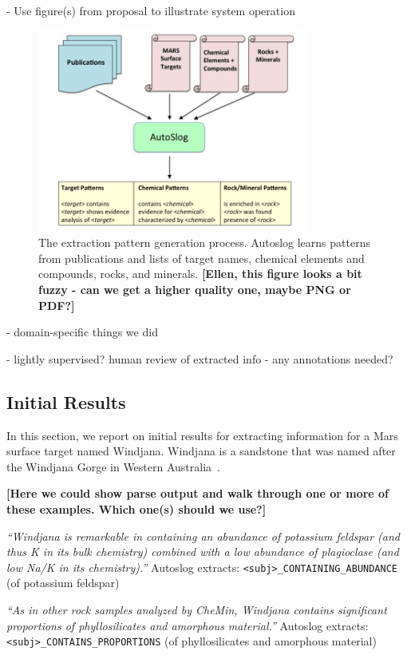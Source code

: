 \documentclass[letterpaper]{article}
\begin{document}
- Use figure(s) from proposal to illustrate system operation

\begin{figure}
\centerline{\includegraphics[width=3.5in]{fig/autoslog-process.jpg}}
\caption{The extraction pattern generation process. Autoslog learns
patterns from publications and lists of target names, chemical
elements and compounds, rocks, and minerals. {\bf [Ellen, this figure
looks a bit fuzzy - can we get a higher quality one, maybe PNG or PDF?]}}
\label{fig:ie}
\end{figure}

- domain-specific things we did

- lightly supervised? human review of extracted info - any annotations needed?

\subsection{Initial Results}

In this section, we report on initial results for extracting
information for a Mars surface target named Windjana.  Windjana is a
sandstone that was named after the Windjana Gorge in Western
Australia~\cite{}. 

{\bf [Here we could show parse output and walk through one or more of
these examples.  Which one(s) should we use?]}

{\em ``Windjana is remarkable in containing an abundance of potassium
feldspar (and thus K in its bulk chemistry) combined with a low
abundance of plagioclase (and low Na/K in its chemistry).''}
Autoslog extracts:
{\tt <subj>\_CONTAINING\_ABUNDANCE} 
(of potassium feldspar)

{\em ``As in other rock samples analyzed by CheMin, Windjana contains
significant proportions of phyllosilicates and amorphous material.''}
Autoslog extracts:
{\tt <subj>\_CONTAINS\_PROPORTIONS}
(of phyllosilicates and amorphous material)
\end{document}

